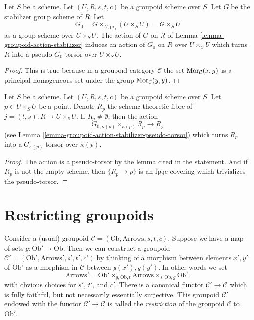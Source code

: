 \begin{lemma}
\label{lemma-groupoid-action-stabilizer-pseudo-torsor}
Let $S$ be a scheme. Let $(U, R, s, t, c)$ be a groupoid scheme
over $S$. Let $G$ be the stabilizer group scheme of $R$.
Let
$$
G_0 = G \times_{U, \text{pr}_0} (U \times_S U) = G \times_S U
$$
as a group scheme over $U \times_S U$. The action of $G$ on $R$ of
Lemma \ref{lemma-groupoid-action-stabilizer}
induces an action of $G_0$ on $R$ over $U \times_S U$
which turns $R$ into a pseudo $G_0$-torsor over $U \times_S U$.
\end{lemma}

\begin{proof}
This is true because in a groupoid category $\mathcal{C}$ the set
$\mathop{\mathrm{Mor}}\nolimits_\mathcal{C}(x, y)$ is a principal homogeneous set
under the group $\mathop{\mathrm{Mor}}\nolimits_\mathcal{C}(y, y)$.
\end{proof}

\begin{lemma}
\label{lemma-fibres-j}
Let $S$ be a scheme. Let $(U, R, s, t, c)$ be a groupoid scheme over $S$.
Let $p \in U \times_S U$ be a point. Denote
$R_p$ the scheme theoretic fibre of $j = (t, s) : R \to U \times_S U$.
If $R_p \not = \emptyset$, then the action
$$
G_{0, \kappa(p)} \times_{\kappa(p)} R_p \longrightarrow R_p
$$
(see
Lemma \ref{lemma-groupoid-action-stabilizer-pseudo-torsor})
which turns $R_p$ into a $G_{\kappa(p)}$-torsor over $\kappa(p)$.
\end{lemma}

\begin{proof}
The action is a pseudo-torsor by the lemma cited in the statement.
And if $R_p$ is not the empty scheme, then $\{R_p \to p\}$
is an fpqc covering which trivializes the pseudo-torsor.
\end{proof}







\section{Restricting groupoids}
\label{section-restrict-groupoid}

\noindent
Consider a (usual) groupoid
$\mathcal{C} = (\text{Ob}, \text{Arrows}, s, t, c)$.
Suppose we have a map of sets $g : \text{Ob}' \to \text{Ob}$.
Then we can construct a groupoid
$\mathcal{C}' = (\text{Ob}', \text{Arrows}', s', t', c')$
by thinking of a morphism between elements $x', y'$ of $\text{Ob}'$
as a morphism in $\mathcal{C}$ between $g(x'), g(y')$.
In other words we set
$$
\text{Arrows}' =
\text{Ob}'
\times_{g, \text{Ob}, t}
\text{Arrows}
\times_{s, \text{Ob}, g}
\text{Ob}'.
$$
with obvious choices for $s'$, $t'$, and $c'$. There is a canonical
functor $\mathcal{C}' \to \mathcal{C}$ which is fully faithful,
but not necessarily essentially surjective. This groupoid $\mathcal{C}'$
endowed with the functor $\mathcal{C}' \to \mathcal{C}$
is called the {\it restriction} of the groupoid
$\mathcal{C}$ to $\text{Ob}'$.

